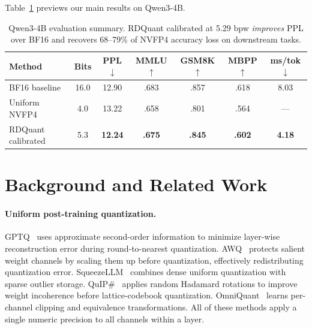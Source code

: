 \documentclass{article}
\begin{document}
Table~\ref{tab:headline} previews our main results on Qwen3-4B.

\begin{table}[t]
\centering
\caption{Qwen3-4B evaluation summary. RDQuant calibrated at 5.29 bpw \emph{improves} PPL over BF16 and recovers 68--79\% of NVFP4 accuracy loss on downstream tasks.}
\label{tab:headline}
\begin{tabular}{lcccccc}
\toprule
\textbf{Method} & \textbf{Bits} & \textbf{PPL}$\downarrow$ & \textbf{MMLU}$\uparrow$ & \textbf{GSM8K}$\uparrow$ & \textbf{MBPP}$\uparrow$ & \textbf{ms/tok}$\downarrow$ \\
\midrule
BF16 baseline       & 16.0 & 12.90 & .683 & .857 & .618 & 8.03 \\
Uniform NVFP4       & 4.0  & 13.22 & .658 & .801 & .564 & --- \\
RDQuant calibrated  & 5.3  & \textbf{12.24} & \textbf{.675} & \textbf{.845} & \textbf{.602} & \textbf{4.18} \\
\bottomrule
\end{tabular}
\end{table}

\section{Background and Related Work}
\label{sec:related}

\paragraph{Uniform post-training quantization.}
GPTQ~\cite{frantar2022gptq} uses approximate second-order information to minimize layer-wise reconstruction error during round-to-nearest quantization.
AWQ~\cite{lin2024awq} protects salient weight channels by scaling them up before quantization, effectively redistributing quantization error.
SqueezeLLM~\cite{kim2023squeezellm} combines dense uniform quantization with sparse outlier storage.
QuIP\#~\cite{chee2024quip} applies random Hadamard rotations to improve weight incoherence before lattice-codebook quantization.
OmniQuant~\cite{shao2024omniquant} learns per-channel clipping and equivalence transformations.
All of these methods apply a single numeric precision to all channels within a layer.
\end{document}
